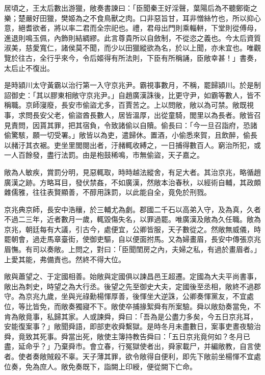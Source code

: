 \begin{pinyinscope}
居頃之，王太后數出游獵，敞奏書諫曰：「臣聞秦王好淫聲，葉陽后為不聽鄭衛之樂；楚嚴好田獵，樊姬為之不食鳥獸之肉。口非惡旨甘，耳非憎絲竹也，所以抑心意，絕耆欲者，將以率二君而全宗祀也。禮，君母出門則乘輜軿，下堂則從傅母，進退則鳴玉佩，內飾則結綢繆。此言尊貴所以自斂制，不從恣之義也。今太后資質淑美，慈愛寬仁，諸侯莫不聞，而少以田獵縱欲為名，於以上聞，亦未宜也。唯觀覽於往古，全行乎來今，令后姬得有所法則，下臣有所稱誦，臣敞幸甚！」書奏，太后止不復出。

是時潁川太守黃霸以治行第一入守京兆尹。霸視事數月，不稱，罷歸潁川。於是制詔御史：「其以膠東相敞守京兆尹。」自趙廣漢誅後，比更守尹，如霸等數人，皆不稱職。京師寖廢，長安市偷盜尤多，百賈苦之。上以問敞，敞以為可禁。敞既視事，求問長安父老，偷盜酋長數人，居皆溫厚，出從童騎，閭里以為長者。敞皆召見責問，因貰其罪，把其宿負，令致諸偷以自贖。偷長曰：「今一旦召詣府，恐諸偷驚駭，願一切受署。」敞皆以為吏，遣歸休。置酒，小偷悉來賀，且飲醉，偷長以赭汙其衣裾。吏坐里閭閱出者，汙赭輒收縛之，一日捕得數百人。窮治所犯，或一人百餘發，盡行法罰。由是枹鼓稀鳴，市無偷盜，天子嘉之。

敞為人敏疾，賞罰分明，見惡輒取，時時越法縱舍，有足大者。其治京兆，略循趙廣漢之跡。方略耳目，發伏禁姦，不如廣漢，然敞本治春秋，以經術自輔，其政頗雜儒雅，往往表賢顯善，不醇用誅罰，以此能自全，竟免於刑戮。

京兆典京師，長安中浩穰，於三輔尤為劇。郡國二千石以高弟入守，及為真，久者不過二三年，近者數月一歲，輒毀傷失名，以罪過罷。唯廣漢及敞為久任職。敞為京兆，朝廷每有大議，引古今，處便宜，公卿皆服，天子數從之。然敞無威儀，時罷朝會，過走馬章臺街，使御吏驅，自以便面拊馬。又為婦畫眉，長安中傳張京兆眉憮。有司以奏敞。上問之，對曰：「臣聞閨房之內，夫婦之私，有過於畫眉者。」上愛其能，弗備責也。然終不得大位。

敞與蕭望之、于定國相善。始敞與定國俱以諫昌邑王超遷。定國為大夫平尚書事，敞出為刺史，時望之為大行丞。後望之先至御史大夫，定國後至丞相，敞終不過郡守。為京兆九歲，坐與光祿勳楊惲厚善，後惲坐大逆誅，公卿奏惲黨友，不宜處位，等比皆免，而敞奏獨寢不下。敞使卒捕掾絮舜有所案驗。舜以敞劾奏當免，不肯為敞竟事，私歸其家。人或諫舜，舜曰：「吾為是公盡力多矣，今五日京兆耳，安能復案事？」敞聞舜語，即部吏收舜繫獄。是時冬月未盡數日，案事吏晝夜驗治舜，竟致其死事。舜當出死，敞使主簿持教告舜曰：「五日京兆竟何如？冬月已盡，延命乎？」乃棄舜市。會立春，行冤獄使者出，舜家載尸，并編敞教，自言使者。使者奏敞賊殺不辜。天子薄其罪，欲令敞得自便利，即先下敞前坐楊惲不宜處位奏，免為庶人。敞免奏既下，詣闕上印綬，便從闕下亡命。


\end{pinyinscope}
